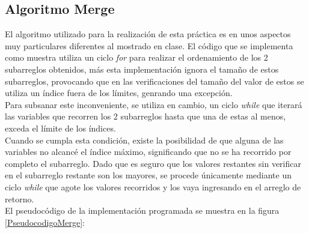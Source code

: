 \hfill \break
\hfill \break
\hfill \break
\hfill \break
\hfill \break
\hfill \break
\hfill \break
\hfill \break
\hfill \break
\hfill \break

\subsection*{Algoritmo Merge}
    El algoritmo utilizado para la realización de esta práctica es en unos aspectos muy particulares diferentes al mostrado en clase. El código que se implementa como muestra utiliza un ciclo \textit{for} para realizar el ordenamiento de los 2 subarreglos obtenidos, más esta implementación ignora el tamaño de estos subarreglos, provocando que en las verificaciones del tamaño del valor de estos se utiliza un índice fuera de los límites, genrando una excepción. \\
    
    Para subsanar este inconveniente, se utiliza en cambio, un ciclo \textit{while} que iterará las variables que recorren los 2 subarreglos hasta que una de estas al menos, exceda el límite de los índices. \\
    
    Cuando se cumpla esta condición, existe la posibilidad de que alguna de las variables no alcancé el índice máximo, significando que no se ha recorrido por completo el subarreglo. Dado que es seguro que los valores restantes sin verificar en el subarreglo restante son los mayores, se procede únicamente mediante un ciclo \textit{while} que agote los valores recorridos y los vaya ingresando en el arreglo de retorno. \\
    
    El pseudocódigo de la implementación programada se muestra en la figura \ref{PseudocodigoMerge}:


